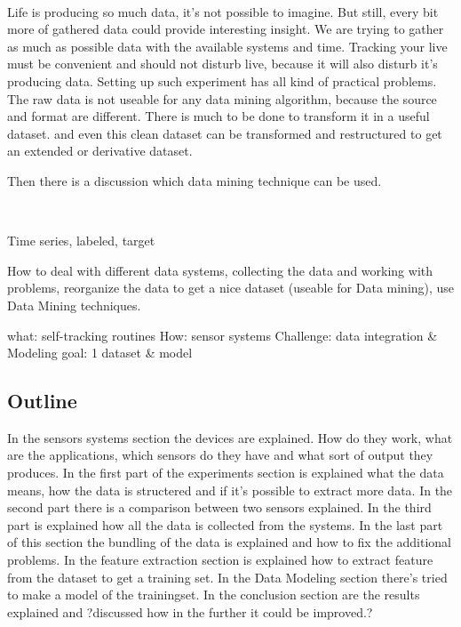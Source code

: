 		\

		Life is producing so much data, it's not possible to imagine. But still, every bit more of gathered data could provide interesting insight. We are trying to gather as much as possible data with the available systems and time. Tracking your live must be convenient and should not disturb live, because it will also disturb it's producing data. Setting up such experiment has all kind of practical problems. The raw data is not useable for any data mining algorithm, because the source and format are different. There is much to be done to transform it in a useful dataset. and even this clean dataset can be transformed and restructured to get an extended or derivative dataset. 

		Then there is a discussion which data mining technique can be used. 


		\
			
		Time series, labeled, target

		How to deal with different data systems, collecting the data and working with problems, reorganize the data to get a nice dataset (useable for Data mining), use Data Mining techniques.

		what: self-tracking routines
		How: sensor systems
		Challenge: data integration \& Modeling
		goal: 1 dataset \& model

	\subsection{Outline}
		In the sensors systems section the devices are explained. How do they work, what are the applications, which sensors do they have and what sort of output they produces. In the first part of the experiments section is explained what the data means, how the data is structered and if it's possible to extract more data. In the second part there is a comparison between two sensors explained. In the third part is explained how all the data is collected from the systems. In the last part of this section the bundling of the data is explained and how to fix the additional problems. In the feature extraction section is explained how to extract feature from the dataset to get a training set. In the Data Modeling section there's tried to make a model of the trainingset. In the conclusion section are the results explained and ?discussed how in the further it could be improved.?
	

